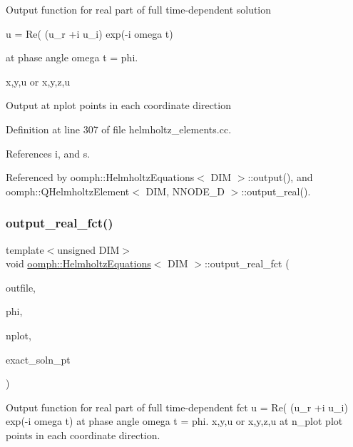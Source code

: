 Output function for real part of full time-\/dependent solution

u = Re( (u\+\_\+r +i u\+\_\+i) exp(-\/i omega t)

at phase angle omega t = phi.

x,y,u or x,y,z,u

Output at nplot points in each coordinate direction 

Definition at line 307 of file helmholtz\+\_\+elements.\+cc.



References i, and s.



Referenced by oomph\+::\+Helmholtz\+Equations$<$ D\+I\+M $>$\+::output(), and oomph\+::\+Q\+Helmholtz\+Element$<$ D\+I\+M, N\+N\+O\+D\+E\+\_\+D $>$\+::output\+\_\+real().

\mbox{\label{classoomph_1_1HelmholtzEquations_a9a9a358cf0e1e628b998353252cf99b4}} 
\subsubsection{\texorpdfstring{output\+\_\+real\+\_\+fct()}{output\_real\_fct()}}
{\footnotesize\ttfamily template$<$unsigned D\+IM$>$ \\
void \hyperlink{classoomph_1_1HelmholtzEquations}{oomph\+::\+Helmholtz\+Equations}$<$ D\+IM $>$\+::output\+\_\+real\+\_\+fct (\begin{DoxyParamCaption}\item[{std\+::ostream \&}]{outfile,  }\item[{const double \&}]{phi,  }\item[{const unsigned \&}]{nplot,  }\item[{\hyperlink{classoomph_1_1FiniteElement_a690fd33af26cc3e84f39bba6d5a85202}{Finite\+Element\+::\+Steady\+Exact\+Solution\+Fct\+Pt}}]{exact\+\_\+soln\+\_\+pt }\end{DoxyParamCaption})}



Output function for real part of full time-\/dependent fct u = Re( (u\+\_\+r +i u\+\_\+i) exp(-\/i omega t) at phase angle omega t = phi. x,y,u or x,y,z,u at n\+\_\+plot plot points in each coordinate direction. 

